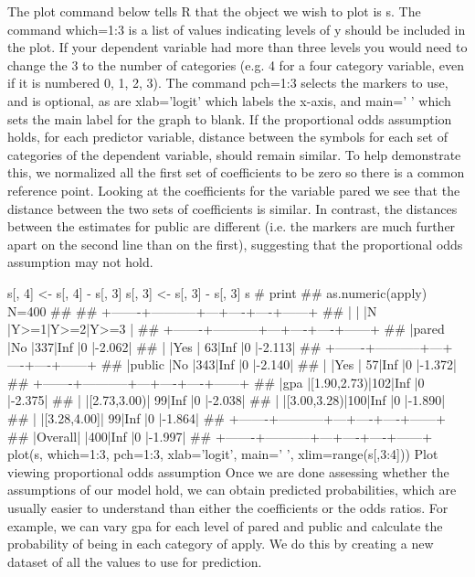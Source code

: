 \documentclass[00-GLMregression.tex]{subfiles}
\begin{document}
The plot command below tells R that the object we wish to plot is s. The command which=1:3 is a list of values indicating levels of y should be included in the plot. If your dependent variable had more than three levels you would need to change the 3 to the number of categories (e.g. 4 for a four category variable, even if it is numbered 0, 1, 2, 3). The command pch=1:3 selects the markers to use, and is optional, as are xlab='logit' which labels the x-axis, and main=' ' which sets the main label for the graph to blank. If the proportional odds assumption holds, for each predictor variable, distance between the symbols for each set of categories of the dependent variable, should remain similar. To help demonstrate this, we normalized all the first set of coefficients to be zero so there is a common reference point. Looking at the coefficients for the variable pared we see that the distance between the two sets of coefficients is similar. In contrast, the distances between the estimates for public are different (i.e. the markers are much further apart on the second line than on the first), suggesting that the proportional odds assumption may not hold.

s[, 4] <- s[, 4] - s[, 3]
s[, 3] <- s[, 3] - s[, 3]
s # print
## as.numeric(apply)    N=400
## 
## +-------+-----------+---+----+----+------+
## |       |           |N  |Y>=1|Y>=2|Y>=3  |
## +-------+-----------+---+----+----+------+
## |pared  |No         |337|Inf |0   |-2.062|
## |       |Yes        | 63|Inf |0   |-2.113|
## +-------+-----------+---+----+----+------+
## |public |No         |343|Inf |0   |-2.140|
## |       |Yes        | 57|Inf |0   |-1.372|
## +-------+-----------+---+----+----+------+
## |gpa    |[1.90,2.73)|102|Inf |0   |-2.375|
## |       |[2.73,3.00)| 99|Inf |0   |-2.038|
## |       |[3.00,3.28)|100|Inf |0   |-1.890|
## |       |[3.28,4.00]| 99|Inf |0   |-1.864|
## +-------+-----------+---+----+----+------+
## |Overall|           |400|Inf |0   |-1.997|
## +-------+-----------+---+----+----+------+
plot(s, which=1:3, pch=1:3, xlab='logit', main=' ', xlim=range(s[,3:4]))
Plot viewing proportional odds assumption
Once we are done assessing whether the assumptions of our model hold, we can obtain predicted probabilities, which are usually easier to understand than either the coefficients or the odds ratios. For example, we can vary gpa for each level of pared and public and calculate the probability of being in each category of apply. We do this by creating a new dataset of all the values to use for prediction.
\end{document}
